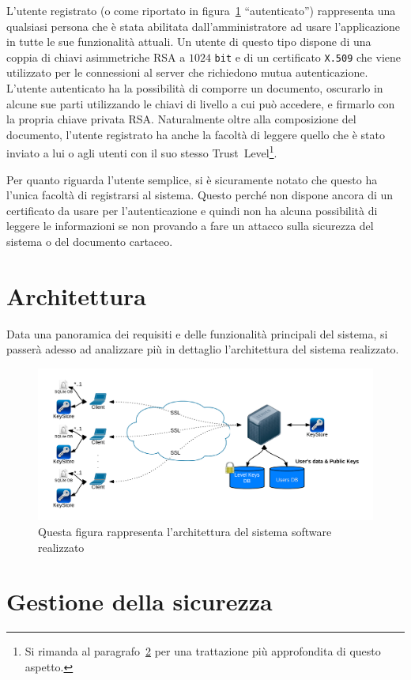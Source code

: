 L'utente registrato (o come riportato in figura~\ref{fig:usecase} ``autenticato'') rappresenta una qualsiasi persona che è stata abilitata dall'amministratore ad usare l'applicazione in tutte le sue funzionalità attuali. Un utente di questo tipo dispone di una coppia di chiavi asimmetriche RSA a $1024$ \texttt{bit} e di un certificato \texttt{X.509} che viene utilizzato per le connessioni al server che richiedono mutua autenticazione. L'utente autenticato ha la possibilità di comporre un documento, oscurarlo in alcune sue parti utilizzando le chiavi di livello a cui può accedere, e firmarlo con la propria chiave privata RSA. 
Naturalmente oltre alla composizione del documento, l'utente registrato ha anche la facoltà di leggere quello che è stato inviato a lui o agli utenti con il suo stesso Trust~Level\footnote{Si rimanda al paragrafo~\ref{sec:sicurezza} per una trattazione più approfondita di questo aspetto.}.

Per quanto riguarda l'utente semplice, si è sicuramente notato che questo ha l'unica facoltà di registrarsi al sistema. Questo perché non dispone ancora di un certificato da usare per l'autenticazione e quindi non ha alcuna possibilità di leggere le informazioni se non provando a fare un attacco sulla sicurezza del sistema o del documento cartaceo.

\section{Architettura}
	\label{sec:architettura}
Data una panoramica dei requisiti e delle funzionalità principali del sistema, si passerà adesso ad analizzare più in dettaglio l'architettura del sistema realizzato.
	\begin{center}	
		\begin{figure}[H]
		\centering
		\includegraphics[scale=0.9]{Immagini/architettura}
		\caption[Architettura del sistema]{Questa figura rappresenta l'architettura del sistema software realizzato}
		\label{fig:usecase}
		\end{figure}
	\end{center}



\section{Gestione della sicurezza}
	\label{sec:sicurezza}
